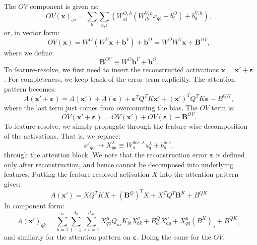 \documentclass[11pt]{article}
\theoremstyle{definition}
\theoremstyle{plain}
\theoremstyle{remark}
\begin{document}
The $OV$ component is given as:
\begin{equation}
    OV(\mathbf{x})_{q a}=\sum_h\sum_{a,i}
    \left(
        W^{O,h}_{a i}\left(W^{V,h}_{i b}x_{q b}+b^O_{i}\right)+b^{V,h}_{a}
    \right),
\end{equation}
or, in vector form:
\begin{equation}
   OV(\mathbf{x})=W^O(W^V\mathbf{x}+\mathbf{b}^V)+\mathbf{b}^O=W^OW^V\mathbf{x}+\mathbf{B}^{OV},
\end{equation}
where we define:
\begin{equation}
    \mathbf{B}^{OV}\equiv W^O\mathbf{b}^V+\mathbf{b}^O.
\end{equation}
To feature-resolve, we first need to insert the reconstructed activations $\mathbf{x}=\mathbf{x}'+\boldsymbol{\varepsilon}$. For completeness, we keep track of the error term explicitly. The attention pattern becomes:
\begin{equation}
A(\mathbf{x}'+\boldsymbol{\varepsilon})=A(\mathbf{x}')+A(\boldsymbol{\varepsilon})+\boldsymbol{\varepsilon}^TQ^TK\mathbf{x}'+(\mathbf{x}')^TQ^TK\boldsymbol{\varepsilon}-B^{QK},
\end{equation}
where the last term just comes from overcounting the bias. The $OV$ term is:
\begin{equation}
    OV(\mathbf{x}'+\boldsymbol{\varepsilon})=OV(\mathbf{x}')+OV(\boldsymbol{\varepsilon})-\mathbf{B}^{OV}.
\end{equation}
To feature-resolve, we simply propagate through the feature-wise decomposition of the activations. That is, we replace:
\begin{equation}
x'_{q a}\to X^\lambda_{q a}\equiv W^{dec,\lambda}_{a}u^\lambda_{q}+b^{dec}_{a},
\end{equation}
through the attention block. We note that the reconstruction error $\boldsymbol{\varepsilon}$ is defined only after reconstruction, and hence cannot be decomposed into underlying features. Putting the feature-resolved activation $X$ into the attention pattern gives:
\begin{equation}
    A(\mathbf{x}')=XQ^TKX+(\mathbf{B}^Q)^TX+X^TQ^T\mathbf{B}^K+B^{QK}
\end{equation}
In component form:
\begin{equation}
    A(\mathbf{x}')_{q k}=\sum_{h=1}^{n}\sum_{i=1}^{d_h}\sum_{a,b=1}^{d_M}X^{\mu}_{q a}Q_{a i}K_{i b}X^\nu_{b k}+B^Q_{a} X^\nu_{a q}+X^\mu_{q a}(B^K)_{a}+B^{QK},
\end{equation}
and similarly for the attention pattern on $\boldsymbol{\varepsilon}$. Doing the same for the $OV$:
\end{document}
